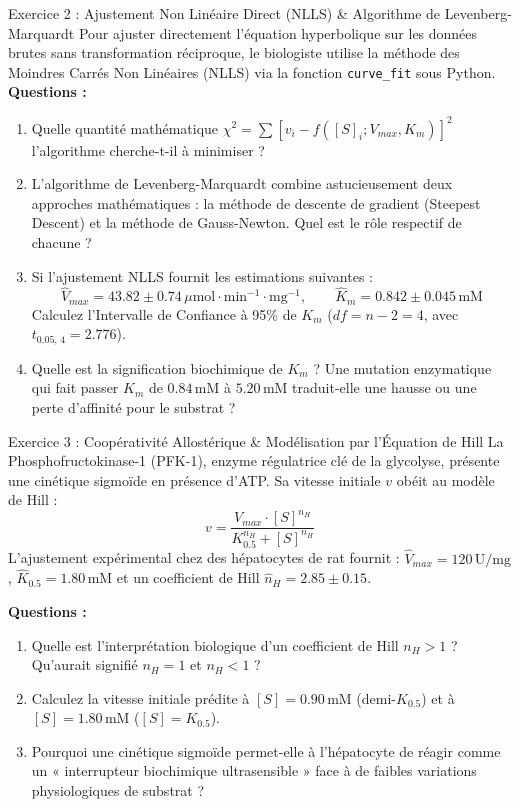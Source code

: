 \documentclass[11pt,a4paper]{article}
\begin{document}
\begin{exercicebox}{Exercice 2 : Ajustement Non Linéaire Direct (NLLS) \& Algorithme de Levenberg-Marquardt}
Pour ajuster directement l'équation hyperbolique sur les données brutes sans transformation réciproque, le biologiste utilise la méthode des Moindres Carrés Non Linéaires (NLLS) via la fonction \texttt{curve\_fit} sous Python.
\textbf{Questions :}
\begin{enumerate}[label=\textbf{\alph*.}]
  \item Quelle quantité mathématique $\chi^2 = \sum [v_i - f([S]_i; V_{max}, K_m)]^2$ l'algorithme cherche-t-il à minimiser ?
  \item L'algorithme de Levenberg-Marquardt combine astucieusement deux approches mathématiques : la méthode de descente de gradient (Steepest Descent) et la méthode de Gauss-Newton. Quel est le rôle respectif de chacune ?
  \item Si l'ajustement NLLS fournit les estimations suivantes :
  \begin{equation*}
    \hat{V}_{max} = 43.82 \pm 0.74\,\mu\text{mol}\cdot\text{min}^{-1}\cdot\text{mg}^{-1}, \qquad \hat{K}_m = 0.842 \pm 0.045\,\text{mM}
  \end{equation*}
  Calculez l'Intervalle de Confiance à 95\% de $K_m$ ($df = n - 2 = 4$, avec $t_{0.05, \, 4} = 2.776$).
  \item Quelle est la signification biochimique de $K_m$ ? Une mutation enzymatique qui fait passer $K_m$ de $0.84\,\text{mM}$ à $5.20\,\text{mM}$ traduit-elle une hausse ou une perte d'affinité pour le substrat ?
\end{enumerate}
\end{exercicebox}

\begin{exercicebox}{Exercice 3 : Coopérativité Allostérique \& Modélisation par l'Équation de Hill}
La Phosphofructokinase-1 (PFK-1), enzyme régulatrice clé de la glycolyse, présente une cinétique sigmoïde en présence d'ATP. Sa vitesse initiale $v$ obéit au modèle de Hill :
\begin{equation*}
  v = \frac{V_{max} \cdot [S]^{n_H}}{K_{0.5}^{n_H} + [S]^{n_H}}
\end{equation*}
L'ajustement expérimental chez des hépatocytes de rat fournit : $\hat{V}_{max} = 120\,\text{U/mg}$, $\hat{K}_{0.5} = 1.80\,\text{mM}$ et un coefficient de Hill $\hat{n}_H = 2.85 \pm 0.15$.

\textbf{Questions :}
\begin{enumerate}[label=\textbf{\alph*.}]
  \item Quelle est l'interprétation biologique d'un coefficient de Hill $n_H > 1$ ? Qu'aurait signifié $n_H = 1$ et $n_H < 1$ ?
  \item Calculez la vitesse initiale prédite à $[S] = 0.90\,\text{mM}$ (demi-$K_{0.5}$) et à $[S] = 1.80\,\text{mM}$ ($[S] = K_{0.5}$).
  \item Pourquoi une cinétique sigmoïde permet-elle à l'hépatocyte de réagir comme un « interrupteur biochimique ultrasensible » face à de faibles variations physiologiques de substrat ?
\end{enumerate}
\end{exercicebox}
\end{document}
